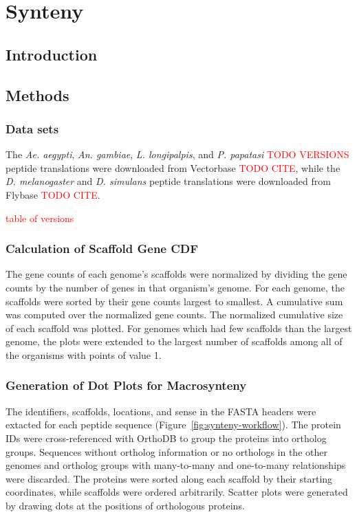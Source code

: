 \section{Synteny}

\subsection{Introduction}

\subsection{Methods}

\subsubsection{Data sets}


The \emph{Ae. aegypti}, \emph{An. gambiae}, \emph{L. longipalpis}, and \emph{P. papatasi} \textcolor{red}{TODO VERSIONS} peptide translations were downloaded from Vectorbase \textcolor{red}{TODO CITE}, while the \emph{D. melanogaster} and \emph{D. simulans} peptide translations were downloaded from Flybase \textcolor{red}{TODO CITE}.

\textcolor{red}{table of versions}


\subsubsection{Calculation of Scaffold Gene CDF}
The gene counts of each genome's scaffolds were normalized by dividing the gene counts by the number of genes in that organism's genome. For each genome, the scaffolds were sorted by their gene counts largest to smallest.  A cumulative sum was computed over the normalized gene counts.   The normalized cumulative size of each scaffold was plotted. For genomes which had few scaffolds than the largest genome, the plots were extended to the largest number of scaffolds among all of the organisms with points of value 1.


\subsubsection{Generation of Dot Plots for Macrosynteny}
The identifiers, scaffolds, locations, and sense in the FASTA headers were extacted for each peptide sequence (Figure~\ref{fig:synteny-workflow}).  The protein IDs were cross-referenced with OrthoDB to group the proteins into ortholog groups.  Sequences without ortholog information or no orthologs in the other genomes and ortholog groups with many-to-many and one-to-many relationships were discarded.  The proteins were sorted along each scaffold by their starting coordinates, while scaffolds were ordered arbitrarily.  Scatter plots were generated by drawing dots at the positions of orthologous proteins.

